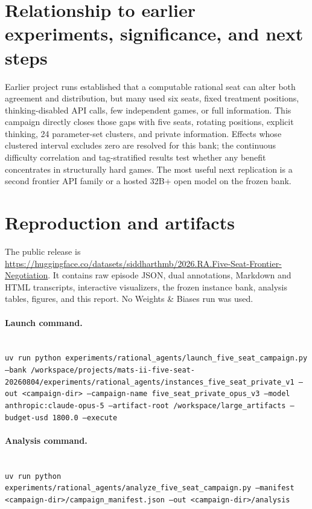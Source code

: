 \documentclass[11pt]{article}
\begin{document}
\section{Relationship to earlier experiments, significance, and next steps}
Earlier project runs established that a computable rational seat can alter both agreement and distribution,
but many used six seats, fixed treatment positions, thinking-disabled API calls, few independent games, or
full information. This campaign directly closes those gaps with five seats, rotating positions, explicit
thinking, 24 parameter-set clusters, and private information. Effects whose clustered interval excludes zero
are resolved for this bank; the continuous difficulty correlation and tag-stratified results test whether any
benefit concentrates in structurally hard games. The most useful next replication is a second frontier API
family or a hosted 32B+ open model on the frozen bank.

\appendix
\section{Reproduction and artifacts}
The public release is \url{https://huggingface.co/datasets/siddharthmb/2026.RA.Five-Seat-Frontier-Negotiation}. It contains raw episode JSON, dual annotations, Markdown and
HTML transcripts, interactive visualizers, the frozen instance bank, analysis tables, figures, and this report.
No Weights \& Biases run was used.

\paragraph{Launch command.}\mbox{}\\
\texttt{uv run python experiments/rational_agents/launch_five_seat_campaign.py --bank /workspace/projects/mats-ii-five-seat-20260804/experiments/rational\_agents/instances\_five\_seat\_private\_v1 --out <campaign-dir> --campaign-name five\_seat\_private\_opus\_v3 --model anthropic:claude-opus-5 --artifact-root /workspace/large\_artifacts --budget-usd 1800.0 --execute}

\paragraph{Analysis command.}\mbox{}\\
\texttt{uv run python experiments/rational\_agents/analyze\_five\_seat\_campaign.py --manifest <campaign-dir>/campaign\_manifest.json --out <campaign-dir>/analysis}
\end{document}
